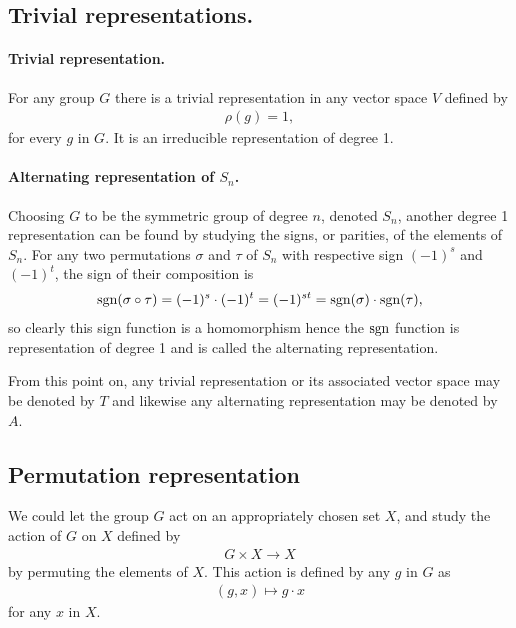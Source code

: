 \subsection{Trivial representations.}\label{sect:trivrepr}

\paragraph{Trivial representation.}


		For any group $G$ there is a trivial representation in any vector space $V$ defined by 
	\begin{align}
		\rho(g) = 1,
	\end{align}
	for every $g$ in $G$. It is an irreducible representation of degree 1. 

\paragraph{Alternating representation of $S_n$.}

	Choosing $G$ to be the symmetric group of degree $n$, denoted $S_n$, another degree 1 representation can be found by studying the signs, or parities, of the elements of $S_n$. For any two permutations $\sigma$ and $\tau$ of $S_n$ with respective sign $(-1)^s$ and $(-1)^t$, the sign of their composition is 
	\begin{align}
		\text{sgn}(\sigma \circ \tau) = (-1)^s \cdot (-1)^t = (-1)^{st} = \text{sgn}(\sigma) \cdot \text{sgn}(\tau),
	\end{align}
	so clearly this sign function is a homomorphism hence the $\text{sgn}$ function is representation of degree 1 and is called the alternating representation.	

\begin{notation}
	From this point on, any trivial representation or its associated vector space may be denoted by $T$ and likewise any alternating representation may be denoted by $A$.
\end{notation}
	

\subsection{Permutation representation}

	We could let the group $G$ act on an appropriately chosen set $X$, and study the action of $G$ on $X$ defined by
	\begin{align}
		G \times X \rightarrow X
	\end{align} 
	by permuting the elements of $X$. This action is defined by any $g$ in $G$ as 
	\begin{align}
		(g,x) \mapsto g \cdot x
	\end{align}
	for any $x$ in $X$.
	

